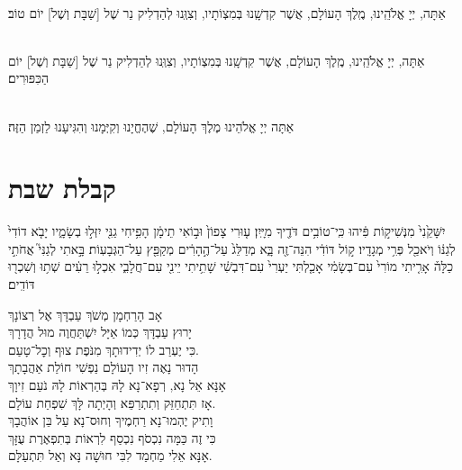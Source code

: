 \documentclass[twoside, openany, parskip=half, 11pt]{book}
\begin{document}
\\
אַתָּה, יְיָ אֱלֹהֵֽינוּ, מֶֽלֶךְ הָעוֹלָם, אֲשֶׁר קִדְשָֽׁנוּ בְּמִצְוֹתָיו, וְצִוְּֽנוּ לְהַדְלִיק נֵר שֶׁל
[שַׁבָּת וְשֶׁל] יוֹם טוֹב׃

\\
אַתָּה, יְיָ אֱלֹהֵֽינוּ, מֶֽלֶךְ הָעוֹלָם, אֲשֶׁר קִדְשָֽׁנוּ בְּמִצְוֹתָיו, וְצִוְּֽנוּ לְהַדְלִיק נֵר שֶׁל
[שַׁבָּת וְשֶׁל] יוֹם הַכִּפּוּרִים׃

\\
אַתָּה יְיָ אֱלֹהֵינוּ מֶלֶךְ הָעוֹלָם, שֶׁהֶחֱיָנוּ וְקִיְּמָנוּ וְהִגִּיעָנוּ לַזְמַן הַזֶּה׃



\chapter[קבלת שבת]{ קבלת שבת }
\label{kabalas_shabbos}


יִשָּׁקֵ֙נִי֙ מִנְּשִׁיק֣וֹת פִּ֔יהוּ כִּֽי־טוֹבִ֥ים דֹּדֶ֖יךָ מִיָּֽיִן׃
ע֤וּרִי צָפוֹן֙ וּב֣וֹאִי תֵימָ֔ן הָפִ֥יחִי גַנִּ֖י יִזְּל֣וּ בְשָׂמָ֑יו יָבֹ֤א דוֹדִי֙ לְגַנּ֔וֹ וְיֹאכַ֖ל פְּרִ֥י מְגָדָֽיו׃ ק֣וֹל דּוֹדִ֔י הִנֵּה־זֶ֖ה בָּ֑א מְדַלֵּג֙ עַל־הֶ֣הָרִ֔ים מְקַפֵּ֖ץ עַל־הַגְּבָעֽוֹת׃ בָּ֣אתִי לְגַנִּי֮ אֲחֹתִ֣י כַלָּה֒ אָרִ֤יתִי מוֹרִי֙ עִם־בְּשָׂמִ֔י אָכַ֤לְתִּי יַעְרִי֙ עִם־דִּבְשִׁ֔י שָׁתִ֥יתִי יֵינִ֖י עִם־חֲלָבִ֑י אִכְל֣וּ רֵעִ֔ים שְׁת֥וּ וְשִׁכְר֖וּ דּוֹדִֽים׃


אָב הָרַחְמָן מְשֹׁךְ עַבְדָּךְ אֶל רְצוֹנָךְ\\
יָרוּץ עַבְדָּךְ כְּמוֹ אַיָּל יִשְׁתַּחֲוֶה מוּל הֲדָרָךְ\\
כִּי יֶעְרַב לוֹ יְדִידוּתָךְ מִנֹּפֶת צוּף וְכׇל־טָעַם.\\


הָדוּר נָאֶה זִיו הָעוֹלָם נַפְשִׁי חוֹלַת אַהֲבָתָךְ\\
אָנָּא אֵל נָא, רְפָא־נָא לָהּ בְּהַרְאוֹת לָהּ נֹעַם זִיוָךְ\\
אָז תִּתְחַזֵּק וְתִתְרַפֵּא וְהָיְתָה לָּךְ שִׁפְחַת עוֹלָם.\\


וָתִיק יֶהְמוּ־נָא רַחְמֶיךָ וְחוּס־נָא עַל בֵּן אוֹהֲבָךְ\\
כִּי זֶה כַּמָּה נִכְסֹף נִכְסַף לִרְאוֹת בְּתִפְאֶרֶת עֻזָּךְ\\
אָנָּא אֵלִי מַחְמַד לִבִּי חוּשָׁה נָּא וְאַל תִּתְעַלָּם.\\
\end{document}
